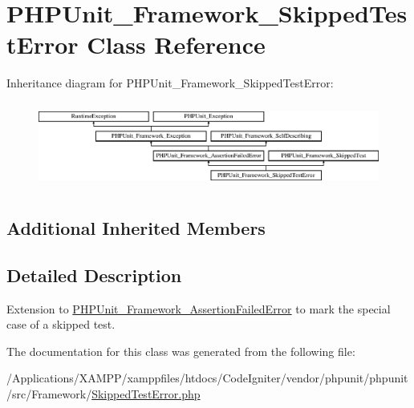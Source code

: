 \hypertarget{class_p_h_p_unit___framework___skipped_test_error}{}\section{P\+H\+P\+Unit\+\_\+\+Framework\+\_\+\+Skipped\+Test\+Error Class Reference}
\label{class_p_h_p_unit___framework___skipped_test_error}
Inheritance diagram for P\+H\+P\+Unit\+\_\+\+Framework\+\_\+\+Skipped\+Test\+Error\+:\begin{figure}[H]
\begin{center}
\leavevmode
\includegraphics[height=2.860792cm]{class_p_h_p_unit___framework___skipped_test_error}
\end{center}
\end{figure}
\subsection*{Additional Inherited Members}


\subsection{Detailed Description}
Extension to \mbox{\hyperlink{class_p_h_p_unit___framework___assertion_failed_error}{P\+H\+P\+Unit\+\_\+\+Framework\+\_\+\+Assertion\+Failed\+Error}} to mark the special case of a skipped test. 

The documentation for this class was generated from the following file\+:\begin{DoxyCompactItemize}
\item 
/\+Applications/\+X\+A\+M\+P\+P/xamppfiles/htdocs/\+Code\+Igniter/vendor/phpunit/phpunit/src/\+Framework/\mbox{\hyperlink{_skipped_test_error_8php}{Skipped\+Test\+Error.\+php}}\end{DoxyCompactItemize}
